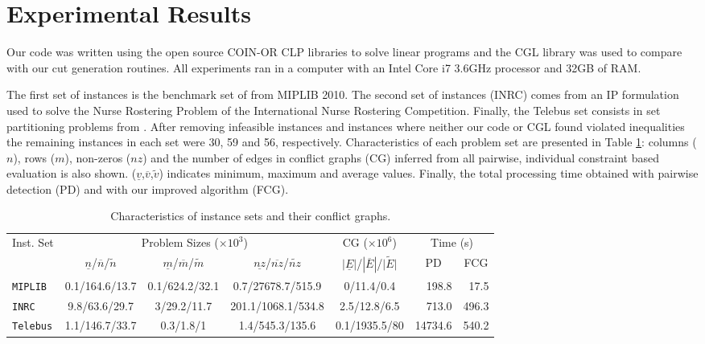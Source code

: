 \documentclass{endm}
\begin{document}
\begin{figure}
\begin{center}
\label{figOH}
\end{center}
\end{figure}

\section{Experimental Results}\label{experiments}

Our code was written using the open source COIN-OR CLP libraries to solve linear programs and the CGL library was used to compare with our cut generation routines. All experiments ran in a computer with an Intel Core i7 3.6GHz processor and 32GB of RAM.

The first set of instances is the benchmark set of from MIPLIB 2010\cite{miplib}. The second set of instances (INRC) comes from an IP formulation  used to solve the Nurse Rostering Problem  \cite{Santos2014} of the International Nurse Rostering Competition. Finally, the Telebus set consists in set partitioning problems from \cite{Borndorfer1998}. After removing infeasible instances and instances where neither our code or CGL found violated inequalities the remaining instances in each set were 30, 59 and 56, respectively. Characteristics of each problem set are presented in Table \ref{tab:inst}: columns ($n$), rows ($m$), non-zeros ($nz$) and the number of edges in conflict graphs (CG) inferred from all pairwise, individual constraint based evaluation is also shown. ($\underline{v}$,$\overline{v}$,$\tilde{v}$) indicates minimum, maximum and average values. Finally, the total processing time obtained with pairwise detection (PD) and with our improved algorithm (FCG). 

\begin{table}[h]
\scriptsize
\caption{Characteristics of instance sets and their conflict graphs.}\label{tab:inst}
\begin{center}
\begin{tabular}{|l|c|c|c|c|r|r|}
\hline 
\multirow{2}{0.8cm}{Inst. Set} & \multicolumn{3}{c|}{{Problem Sizes ($\times10^{3}$)}} & {CG ($\times10^{6}$)} & \multicolumn{2}{c|}{{Time (s)}}\tabularnewline
\cline{2-7} 
 & {$\underline{n}$/$\overline{n}$/$\tilde{n}$} & {$\underline{m}$/$\overline{m}$/$\tilde{m}$} & {$\underline{nz}$/$\overline{nz}$/$\tilde{nz}$} & {$|\underline{E}|$/$|\overline{E}|$/$\tilde{|E|}$} & \multicolumn{1}{c|}{PD} & \multicolumn{1}{c|}{FCG}\tabularnewline
\hline 
\hline 
\texttt{MIPLIB} & {0.1/164.6/13.7} & {0.1/624.2/32.1} & {0.7/27678.7/515.9} & {0/11.4/0.4} & {198.8} & {17.5}\tabularnewline
\hline 
\texttt{INRC} & {9.8/63.6/29.7} & {3/29.2/11.7} & {201.1/1068.1/534.8} & {2.5/12.8/6.5} & {713.0} & {496.3}\tabularnewline
\hline 
\texttt{Telebus} & {1.1/146.7/33.7} & {0.3/1.8/1} & {1.4/545.3/135.6} & {0.1/1935.5/80} & {14734.6} & {540.2}\tabularnewline
\hline 
\end{tabular}
\end{center}
\end{table}
\end{document}

